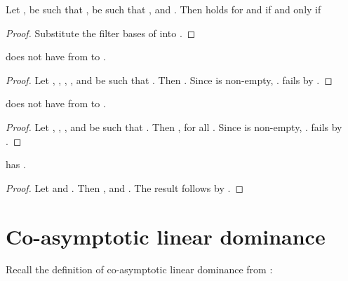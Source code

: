 \documentclass[b5paper, english, oneside]{memoir}
\begin{document}
\begin{theorem}
\label{AsymptoticCompositionForFixedS}
Let ,  be such that ,  be such that , and . Then  holds for  and  if and only if

\end{theorem}

\begin{proof}
Substitute the filter bases of  into .
\end{proof}

\begin{theorem}
\label{AsymptoticInjectiveSubComposabilityFails}
 does not have  from  to .
\end{theorem}

\begin{proof}
Let , , , , and  be such that . Then . Since  is non-empty, .  fails by .
\end{proof}

\begin{theorem}
\label{AsymptoticInjectiveSubComposabilityFailsInZ}
 does not have  from  to .
\end{theorem}

\begin{proof}
Let , , , and  be such that . Then , for all . Since  is non-empty, .  fails by .
\end{proof}

\begin{theorem}
\label{AsymptoticExtensibility}
 has .
\end{theorem}

\begin{proof}
Let  and . Then , and . The result follows by . 
\end{proof}

\section{Co-asymptotic linear dominance}
\label{CoasymptoticLinearDominance}

Recall the definition of co-asymptotic linear dominance from :
\end{document}
